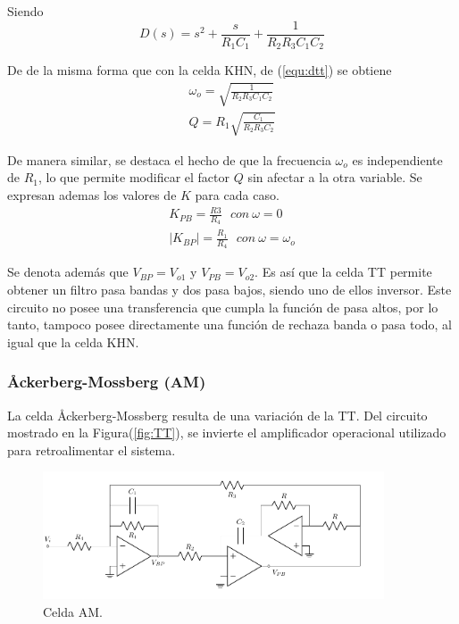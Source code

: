 Siendo
\begin{equation}
	D(s) = s^2 + \frac{s}{R_1 C_1} + \frac{1}{R_2 R_3 C_1 C_2}
	\label{equ:dtt}
\end{equation}

De de la misma forma que con la celda KHN, de (\ref{equ:dtt}) se obtiene
\begin{equation}
\begin{split}
	\omega_o = \sqrt{\frac{1}{R_2 R_3 C_1 C_2}} \\
	Q = R_1 \sqrt{\frac{C_1}{R_2 R_3 C_2}} 
\end{split}
\end{equation}

De manera similar, se destaca el hecho de que la frecuencia $\omega_o$ es independiente de $R_1$, lo que permite modificar el factor $Q$ sin afectar a la otra variable. Se expresan ademas los valores de $K$ para cada caso.
\begin{equation}
\begin{split}
	K_{PB} = \frac{R3}{R_4}	\	\	\ con \ \omega = 0 \\
	|K_{BP}| = \frac{R_1}{R_4}	\	\	\ con \ \omega = \omega_o
\end{split}
\end{equation}

Se denota además que $V_{BP} = V_{o1}$ y $V_{PB} = V_{o2}$. Es así que la celda TT permite obtener un filtro pasa bandas y dos pasa bajos, siendo uno de ellos inversor. Este circuito no posee una transferencia que cumpla la función de pasa altos, por lo tanto, tampoco posee directamente una función de rechaza banda o pasa todo, al igual que la celda KHN.

\subsubsection{\r{A}ckerberg-Mossberg (AM)}
La celda \r{A}ckerberg-Mossberg resulta de una variación de la TT. Del circuito mostrado en la Figura(\ref{fig:TT}), se invierte el amplificador operacional utilizado para retroalimentar el sistema.
\begin{figure}[H]
\centering
	\includegraphics[width=0.9\textwidth]{ImagenesEjercicio4/AM.pdf}
	\caption{Celda AM.}
	\label{fig:AM}
\end{figure}

